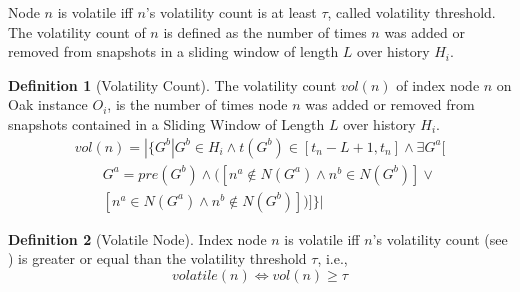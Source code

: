 \documentclass[abstracton,12pt]{scrartcl}
\theoremstyle{definition}
\newtheorem{definition}{Definition}
\begin{document}
Node $n$ is volatile iff $n$'s volatility count is at least $\tau$, called
volatility threshold. The volatility count of $n$ is defined as the number of
times $n$ was added or removed from snapshots in a sliding window of length
$L$ over history $H_i$.

\begin{definition}[Volatility Count]
  The volatility count $vol(n)$ of index node $n$ on Oak instance $O_i$, is the number of
  times node $n$ was added or removed from snapshots contained in a Sliding
  Window of Length $L$ over history $H_i$.
  \vspace{3mm}
  \begin{align*}
    vol(n) = | \{ G^b | G^b \in H_i \land t(G^b) \in [t_n-L+1, t_n] \land \exists G^a[ \\
    \qquad G^a = pre(G^b) \land ([n^a \notin N(G^a) \land n^b \in N(G^b)]\lor \\
    \qquad [n^a \in N(G^a) \land n^b \notin N(G^b)] )]\} |
  \end{align*}
  \vspace{-4mm}
  \label{def:vol_count}
\end{definition}

\vspace{-4mm}

\begin{definition}[Volatile Node]
  Index node $n$ is volatile iff $n$'s volatility count (see
  ) is greater or equal than the volatility threshold
  $\tau$, i.e.,
  $$ volatile(n) \iff vol(n) \geq \tau $$
  \label{def:volatile_node}
\end{definition}

\vspace{-7mm}
\end{document}
